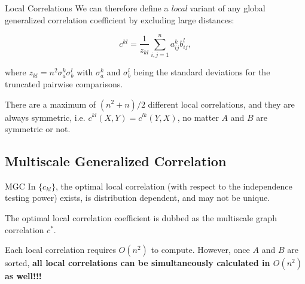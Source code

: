 \documentclass{beamer}
\newcommand{\G}{c}
\begin{document}
\begin{frame}{Local Correlations}
We can therefore define a \emph{local} variant of any global generalized correlation coefficient by  excluding large distances: 

\pause
\medskip
\begin{equation}
\label{localCoef}
\G^{kl}=\dfrac{1}{z_{kl}} {\textstyle \sum_{i,j=1}^n a_{ij}^k b_{ij}^l},
\end{equation}

\pause
\medskip
where $z_{kl}=n^2 \sigma_a^k \sigma_b^l$ with $\sigma_a^k$ and $\sigma_b^{l}$ being the standard deviations for the truncated pairwise comparisons. 

\pause
\medskip
There are a maximum of $(n^2+n)/2$ different local correlations, and they are always symmetric, i.e. $\G^{kl}(X,Y)=\G^{lk}(Y,X)$, no matter $A$ and $B$ are symmetric or not.
\end{frame}

\subsection{Multiscale Generalized Correlation}
\begin{frame}{MGC}
In $\{\G_{kl}\}$, the optimal local correlation (with respect to the independence testing power) exists, is distribution dependent, and may not be unique.

\pause
\medskip
The optimal local correlation coefficient is dubbed as the multiscale graph correlation $\G^{*}$.

\pause
\medskip
Each local correlation requires $O(n^2)$ to compute. However, once $A$ and $B$ are sorted, \textbf{all local correlations can be simultaneously calculated in $O(n^2)$ as well!!!}
\end{frame}
\end{document}
